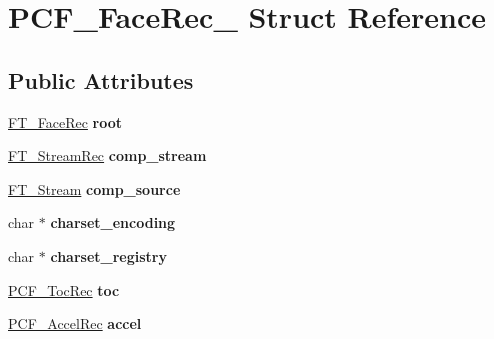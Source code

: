 \hypertarget{struct_p_c_f___face_rec__}{}\section{P\+C\+F\+\_\+\+Face\+Rec\+\_\+ Struct Reference}
\label{struct_p_c_f___face_rec__}
\subsection*{Public Attributes}
\begin{DoxyCompactItemize}
\item 
\mbox{\label{struct_p_c_f___face_rec___a51fe9d1bbe61a05d6844da61bc6d1086}} 
\hyperlink{struct_f_t___face_rec__}{F\+T\+\_\+\+Face\+Rec} {\bfseries root}
\item 
\mbox{\label{struct_p_c_f___face_rec___ae31e67c5d8b897040caee670ee3137e8}} 
\hyperlink{struct_f_t___stream_rec__}{F\+T\+\_\+\+Stream\+Rec} {\bfseries comp\+\_\+stream}
\item 
\mbox{\label{struct_p_c_f___face_rec___a591bc81b43ed647509d2b179d3bd0a67}} 
\hyperlink{struct_f_t___stream_rec__}{F\+T\+\_\+\+Stream} {\bfseries comp\+\_\+source}
\item 
\mbox{\label{struct_p_c_f___face_rec___a21c4085f5d1a87078d357f85a2cf26bf}} 
char $\ast$ {\bfseries charset\+\_\+encoding}
\item 
\mbox{\label{struct_p_c_f___face_rec___a4296eb308b2f114e911b04ab030816ec}} 
char $\ast$ {\bfseries charset\+\_\+registry}
\item 
\mbox{\label{struct_p_c_f___face_rec___aa5f36f50831f2f8de1caf2cd3cf66151}} 
\hyperlink{struct_p_c_f___toc_rec__}{P\+C\+F\+\_\+\+Toc\+Rec} {\bfseries toc}
\item 
\mbox{\label{struct_p_c_f___face_rec___a95b1db5f12b0093fbf2564778518fdd3}} 
\hyperlink{struct_p_c_f___accel_rec__}{P\+C\+F\+\_\+\+Accel\+Rec} {\bfseries accel}
\item 
\mbox{\label{struct_p_c_f___face_rec___a5e4dadfec8bde8ce312ef16d13df661b}} 

\end{DoxyCompactItemize}
